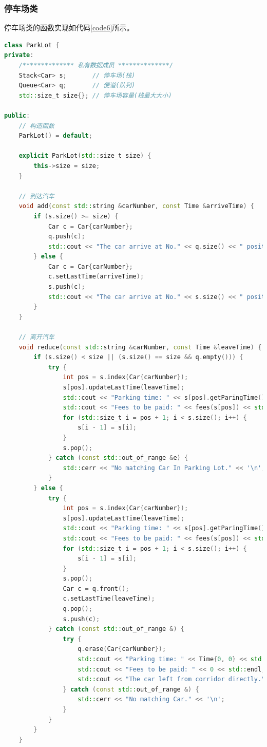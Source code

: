 \documentclass{ctexart}
\begin{document}
    \subsubsection{停车场类}
    停车场类的函数实现如代码\ref{code6}所示。
\begin{lstlisting}[language=C++,caption=ParkLot类模板的实现,label=code6]
class ParkLot {
private:
    /************** 私有数据成员 **************/
    Stack<Car> s;       // 停车场(栈)
    Queue<Car> q;       // 便道(队列)
    std::size_t size{}; // 停车场容量(栈最大大小)

public:
    // 构造函数
    ParkLot() = default;

    explicit ParkLot(std::size_t size) {
        this->size = size;
    }

    // 到达汽车
    void add(const std::string &carNumber, const Time &arriveTime) {
        if (s.size() >= size) {
            Car c = Car{carNumber};
            q.push(c);
            std::cout << "The car arrive at No." << q.size() << " position in corridor." << std::endl;
        } else {
            Car c = Car{carNumber};
            c.setLastTime(arriveTime);
            s.push(c);
            std::cout << "The car arrive at No." << s.size() << " position in parking lot." << std::endl;
        }
    }

    // 离开汽车
    void reduce(const std::string &carNumber, const Time &leaveTime) {
        if (s.size() < size || (s.size() == size && q.empty())) {
            try {
                int pos = s.index(Car{carNumber});
                s[pos].updateLastTime(leaveTime);
                std::cout << "Parking time: " << s[pos].getParingTime() << std::endl;
                std::cout << "Fees to be paid: " << fees(s[pos]) << std::endl;
                for (std::size_t i = pos + 1; i < s.size(); i++) {
                    s[i - 1] = s[i];
                }
                s.pop();
            } catch (const std::out_of_range &e) {
                std::cerr << "No matching Car In Parking Lot." << '\n';
            }
        } else {
            try {
                int pos = s.index(Car{carNumber});
                s[pos].updateLastTime(leaveTime);
                std::cout << "Parking time: " << s[pos].getParingTime() << std::endl;
                std::cout << "Fees to be paid: " << fees(s[pos]) << std::endl;
                for (std::size_t i = pos + 1; i < s.size(); i++) {
                    s[i - 1] = s[i];
                }
                s.pop();
                Car c = q.front();
                c.setLastTime(leaveTime);
                q.pop();
                s.push(c);
            } catch (const std::out_of_range &) {
                try {
                    q.erase(Car{carNumber});
                    std::cout << "Parking time: " << Time{0, 0} << std::endl;
                    std::cout << "Fees to be paid: " << 0 << std::endl;
                    std::cout << "The car left from corridor directly." << std::endl;
                } catch (const std::out_of_range &) {
                    std::cerr << "No matching Car." << '\n';
                }
            }
        }
    }


\end{lstlisting}
\end{document}
